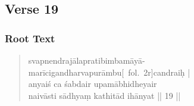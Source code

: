 \documentclass[12pt]{article}
\begin{document}
% 
 
\subsection{Verse 19}
\subsubsection{Root Text}
\begin{quote}
	svapnendrajālapratibimbamāyā-\\
	marīcigandharvapurāmbu{[}\MS\ fol.\ 2r{]}candraiḥ |\\
	anyaiś ca śabdair upamābhidheyair \\
	naivāsti sādhyaṃ kathitād ihānyat || 19 ||
% 
\end{quote}
\end{document}
